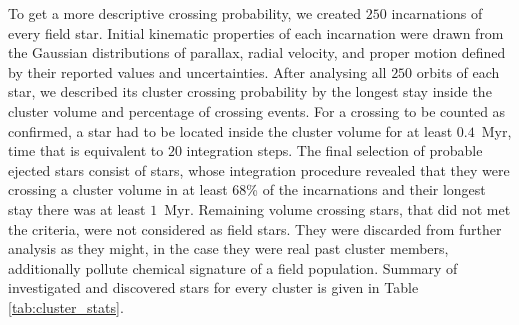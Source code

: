 To get a more descriptive crossing probability, we created $250$ incarnations of every field star. Initial kinematic properties of each incarnation were drawn from the Gaussian distributions of parallax, radial velocity, and proper motion defined by their reported values and uncertainties. After analysing all $250$ orbits of each star, we described its cluster crossing probability by the longest stay inside the cluster volume and percentage of crossing events. For a crossing to be counted as confirmed, a star had to be located inside the cluster volume for at least $0.4$~Myr, time that is equivalent to $20$ integration steps. The final selection of probable ejected stars consist of stars, whose integration procedure revealed that they were crossing a cluster volume in at least $68$\% of the incarnations and their longest stay there was at least $1$~Myr. Remaining volume crossing stars, that did not met the criteria, were not considered as field stars. They were discarded from further analysis as they might, in the case they were real past cluster members, additionally pollute chemical signature of a field population. Summary of investigated and discovered stars for every cluster is given in Table \ref{tab:cluster_stats}.

